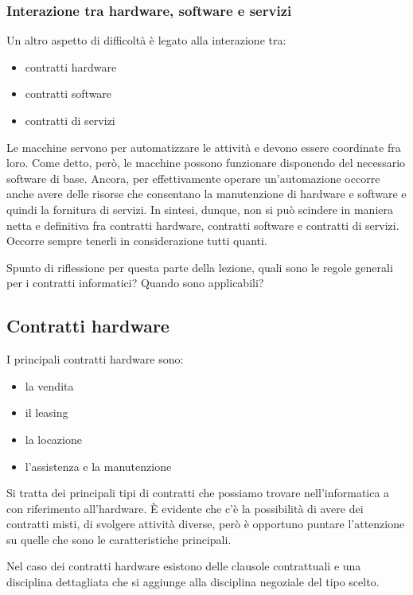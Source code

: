 \subsubsection{Interazione tra hardware, software e servizi}
Un altro aspetto di difficoltà è legato alla interazione tra:

\begin{itemize}
    \item contratti hardware
    \item contratti software
    \item contratti di servizi
\end{itemize}

Le macchine servono per automatizzare le attività e devono essere coordinate fra loro. Come detto, però, le macchine possono funzionare disponendo del necessario software di base. Ancora, per effettivamente operare un'automazione occorre anche avere delle risorse che consentano la manutenzione di hardware e software e quindi la fornitura di servizi. In sintesi, dunque, non si può scindere in maniera netta e definitiva fra contratti hardware, contratti software e contratti di servizi. Occorre sempre tenerli in considerazione tutti quanti. 

Spunto di riflessione per questa parte della lezione, quali sono le regole generali per i contratti informatici? Quando sono applicabili? 

\subsection{Contratti hardware}
I principali contratti hardware sono:

\begin{itemize}
    \item la vendita
    \item il leasing
    \item la locazione
    \item l'assistenza e la manutenzione
\end{itemize}

Si tratta dei principali tipi di contratti che possiamo trovare nell'informatica a con riferimento all'hardware. È evidente che c'è la possibilità di avere dei contratti misti, di svolgere attività diverse, però è opportuno puntare l'attenzione su quelle che sono le caratteristiche principali. 

Nel caso dei contratti hardware esistono delle clausole contrattuali e una disciplina dettagliata che si aggiunge alla disciplina negoziale del tipo scelto. 

